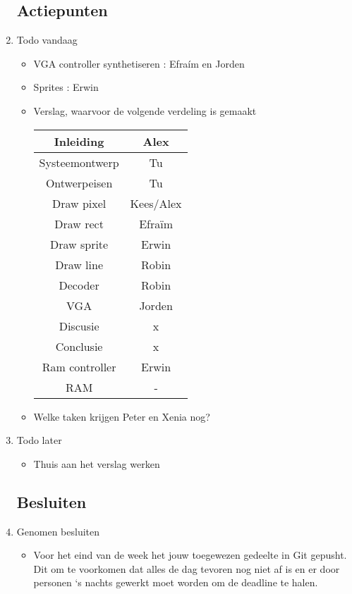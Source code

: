 \documentclass{article}
\begin{document}
\begin{enumerate}
	\subsection*{Actiepunten}
	\item Todo vandaag
	\begin{itemize}
		\item VGA controller synthetiseren : Efraím en Jorden
		\item Sprites : Erwin
		\item Verslag, waarvoor de volgende verdeling is gemaakt \\
		\begin{tabular}{|c|c|}
		\hline 
		Inleiding & Alex \\ 
		\hline 
		Systeemontwerp & Tu\\
		\hline
		Ontwerpeisen & Tu \\ 
		\hline 
		Draw pixel & Kees/Alex \\ 
		\hline 
		Draw rect & Efraïm \\ 
		\hline 
		Draw sprite & Erwin \\ 
		\hline 
		Draw line & Robin \\ 
		\hline 
		Decoder & Robin \\ 
		\hline 
		VGA & Jorden \\ 
		\hline 
		Discusie & x \\ 
		\hline 
		Conclusie & x \\ 
		\hline 
		Ram controller & Erwin \\ 
		\hline 
RAM & - \\ 
\hline 

\end{tabular} 
	\item Welke taken krijgen Peter en Xenia nog?
	\end{itemize}
	\item Todo later
	\begin{itemize}
		\item Thuis aan het verslag werken
	\end{itemize}

	\subsection*{Besluiten}
	\item Genomen besluiten
	\begin{itemize}
		\item Voor het eind van de week het jouw toegewezen gedeelte in Git gepusht. Dit om te voorkomen dat alles de dag tevoren nog niet af is en 
		er door personen `s nachts gewerkt moet worden om de deadline te halen. 
		

\end{itemize}
\end{enumerate}
\end{document}
